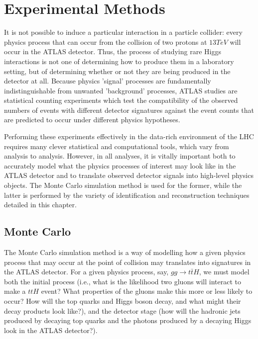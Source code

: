 \section{Experimental Methods} \label{sec:methods} 

It is not possible to induce a particular interaction in a particle collider: every physics process that can occur from the collision of two protons at $13 TeV$ will occur in the ATLAS detector. Thus, the process of studying rare Higgs interactions is not one of determining how to produce them in a laboratory setting, but of determining whether or not they are being produced in the detector at all. Because physics 'signal' processes are fundamentally indistinguishable from unwanted 'background' processes, ATLAS studies are statistical counting experiments which test the compatibility of the observed numbers of events with different detector signatures against the event counts that are predicted to occur under different physics hypotheses. 

Performing these experiments effectively in the data-rich environment of the LHC requires many clever statistical and computational tools, which vary from analysis to analysis. However, in all analyses, it is vitally important both to accurately model what the physics processes of interest may look like in the ATLAS detector and to translate observed detector signals into high-level physics objects. The Monte Carlo simulation method is used for the former, while the latter is performed by the variety of identification and reconstruction techniques detailed in this chapter.

\subsection{Monte Carlo} \label{sec:MC} 

The Monte Carlo simulation method is a way of modelling how a given physics process that may occur at the point of collision may translates into signatures in the ATLAS detector. For a given physics process, say, $gg \rightarrow t \bar{t} H$, we must model both the initial process (i.e., what is the likelihood two gluons will interact to make a $ttH$ event? What properties of the gluons make this more or less likely to occur? How will the top quarks and Higgs boson decay, and what might their decay products look like?), and the detector stage (how will the hadronic jets produced by decaying top quarks and the photons produced by a decaying Higgs look in the ATLAS detector?).

